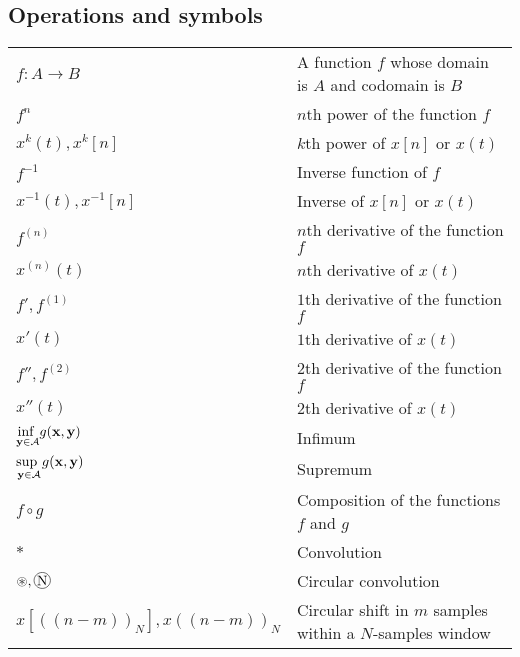 \documentclass{article}
\newcommand*\circconv[1]{%
\tikz[baseline=(C.base)]\node[draw,circle,inner sep=0.5pt](C) {#1};\!
}
\begin{document}
\subsection{Operations and symbols}
\begin{xltabular}{\textwidth}{XX}
    \(f: A \rightarrow B\)& A function \(f\) whose domain is \(A\) and codomain is \(B\)\\
    \(f^{n}\) & \(n\)th power of the function \(f\)\\
    \(x^{k}(t), x^{k}[n]\) & \(k\)th power of \({x}[n]\) or \({x}(t)\)\\
    \(f^{-1}\) & Inverse function of \(f\)\\
    \(x^{-1}(t), x^{-1}[n]\) & Inverse of \({x}[n]\) or \({x}(t)\)\\
    \(f^{\left( n \right)}\) & \(n\)th derivative of the function \(f\)\\
    \(x^{(n)}(t)\) & \(n\)th derivative of \({x}(t)\)\\
    \(f', f^{\left( 1 \right)}\) & \(1\)th derivative of the function \(f\)\\
    \(x'(t)\) & \(1\)th derivative of \({x}(t)\)\\
    \(f'', f^{\left( 2 \right)}\) & \(2\)th derivative of the function \(f\)\\
    \(x''(t)\) & \(2\)th derivative of \({x}(t)\)\\
    \(\underset{\mathbf{y} \in \mathcal{A}}{\textnormal{inf }} g(\mathbf{x},\mathbf{y})\) & Infimum\\
    \(\underset{\mathbf{y} \in \mathcal{A}}{\textnormal{sup }} g(\mathbf{x},\mathbf{y})\) & Supremum\\
    \(f \circ g\) & Composition of the functions \(f\) and \(g\)\\
    \(*\) & Convolution\\
    \(\circledast, \circconv{N}\) & Circular convolution\\
    \(x\left[ \left( \left( n - m \right) \right)_N \right], x \left( \left( n - m \right) \right)_N\) & Circular shift in \(m\) samples within a \(N\)-samples window\\
\end{xltabular}
\end{document}
